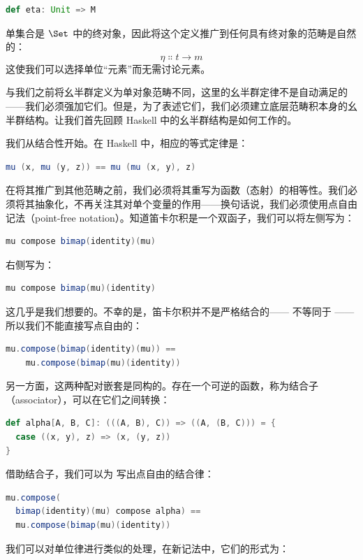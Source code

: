 \begin{lstlisting}[language=Scala]
def eta: Unit => M
\end{lstlisting}
单集合是 $\Set$ 中的终对象，因此将这个定义推广到任何具有终对象的范畴是自然的：
\[\eta \Colon t \to m\]
这使我们可以选择单位“元素”而无需讨论元素。

与我们之前将幺半群定义为单对象范畴不同，这里的幺半群定律不是自动满足的——我们必须强加它们。但是，为了表述它们，我们必须建立底层范畴积本身的幺半群结构。让我们首先回顾 Haskell 中的幺半群结构是如何工作的。

我们从结合性开始。在 Haskell 中，相应的等式定律是：

\begin{lstlisting}[language=Scala]
mu (x, mu (y, z)) == mu (mu (x, y), z)
\end{lstlisting}
在将其推广到其他范畴之前，我们必须将其重写为函数（态射）的相等性。我们必须将其抽象化，不再关注其对单个变量的作用——换句话说，我们必须使用点自由记法（point-free notation）。知道笛卡尔积是一个双函子，我们可以将左侧写为：

\begin{lstlisting}[language=Scala]
mu compose bimap(identity)(mu)
\end{lstlisting}
右侧写为：

\begin{lstlisting}[language=Scala]
mu compose bimap(mu)(identity)
\end{lstlisting}
这几乎是我们想要的。不幸的是，笛卡尔积并不是严格结合的—— 不等同于 ——所以我们不能直接写点自由的：

\begin{lstlisting}[language=Scala]
mu.compose(bimap(identity)(mu)) ==
    mu.compose(bimap(mu)(identity))
\end{lstlisting}
另一方面，这两种配对嵌套是同构的。存在一个可逆的函数，称为结合子（associator），可以在它们之间转换：

\begin{lstlisting}[language=Scala]
def alpha[A, B, C]: (((A, B), C)) => ((A, (B, C))) = {
  case ((x, y), z) => (x, (y, z))
}
\end{lstlisting}
借助结合子，我们可以为  写出点自由的结合律：

\begin{lstlisting}[language=Scala]
mu.compose(
  bimap(identity)(mu) compose alpha) ==
  mu.compose(bimap(mu)(identity))
\end{lstlisting}
我们可以对单位律进行类似的处理，在新记法中，它们的形式为：

